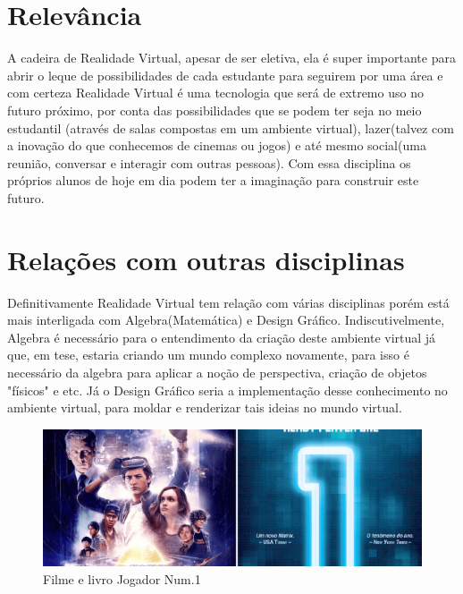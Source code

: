 \documentclass{paper}
\begin{document}
\section{Relevância}
A cadeira de Realidade Virtual, apesar de ser eletiva, ela é super importante para abrir o leque de possibilidades de cada estudante para seguirem por uma área e com certeza Realidade Virtual é uma tecnologia que será de extremo uso no futuro próximo, por conta das possibilidades que se podem ter seja no meio estudantil\cite{Fonte2} (através de salas compostas em um ambiente virtual), lazer(talvez com a inovação do que conhecemos de cinemas ou jogos) e até mesmo social\cite{Fonte}(uma reunião, conversar e interagir com outras pessoas). Com essa disciplina os próprios alunos de hoje em dia podem ter a imaginação para construir este futuro. 
\section{Relações com outras disciplinas}
Definitivamente Realidade Virtual tem relação com várias disciplinas porém está mais interligada com Algebra(Matemática) e Design Gráfico. Indiscutivelmente, Algebra é necessário para o entendimento da criação deste ambiente virtual já que, em tese, estaria criando um mundo complexo novamente, para isso é necessário da algebra para aplicar a noção de perspectiva, criação de objetos "físicos" e etc. Já o Design Gráfico seria a implementação desse conhecimento no ambiente virtual, para moldar e renderizar tais ideias no mundo virtual.
\begin{figure}[h!]
\centering
\includegraphics[scale=0.24]{Jogador.png}
\caption{Filme e livro Jogador Num.1\cite{Fonte3}}
\end{figure}



\end{document}
